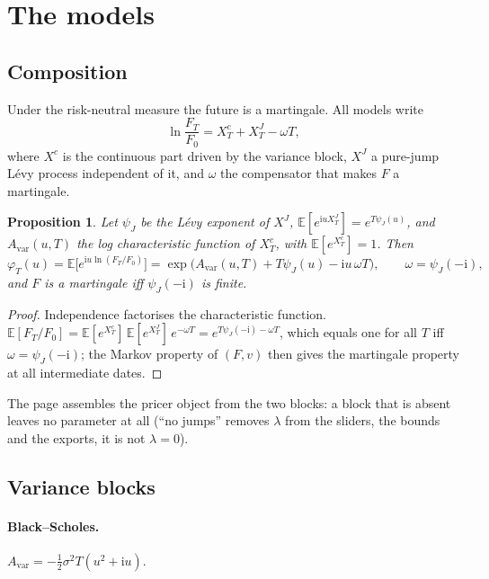 \documentclass[11pt,a4paper]{article}
\newtheorem{proposition}{Proposition}
\theoremstyle{definition}
\theoremstyle{remark}
\newcommand{\E}{\mathbb{E}}
\newcommand{\ii}{\mathrm{i}}
\begin{document}
\section{The models}\label{sec:models}
\subsection{Composition}
Under the risk-neutral measure the future is a martingale. All models write
\begin{equation}\label{eq:compo}
  \ln\frac{F_T}{F_0}=X^{c}_T+X^{J}_T-\omega T,
\end{equation}
where $X^c$ is the continuous part driven by the variance block, $X^J$ a pure-jump Lévy process independent of it, and $\omega$
the compensator that makes $F$ a martingale.
\begin{proposition}\label{prop:compo}
Let $\psi_J$ be the Lévy exponent of $X^J$, $\E[e^{\ii uX^J_T}]=e^{T\psi_J(u)}$, and $A_{\mathrm{var}}(u,T)$ the log characteristic
function of $X^c_T$, with $\E[e^{X^c_T}]=1$. Then
\begin{equation}
  \varphi_T(u)=\E\big[e^{\ii u\ln(F_T/F_0)}\big]=\exp\Big(A_{\mathrm{var}}(u,T)+T\psi_J(u)-\ii u\,\omega T\Big),\qquad \omega=\psi_J(-\ii),
\end{equation}
and $F$ is a martingale iff $\psi_J(-\ii)$ is finite.
\end{proposition}
\begin{proof}
Independence factorises the characteristic function. $\E[F_T/F_0]=\E[e^{X^c_T}]\,\E[e^{X^J_T}]\,e^{-\omega T}
=e^{T\psi_J(-\ii)-\omega T}$, which equals one for all $T$ iff $\omega=\psi_J(-\ii)$; the Markov property of $(F,v)$ then gives
the martingale property at all intermediate dates.
\end{proof}
The page assembles the pricer object from the two blocks: a block that is absent leaves no parameter at all (``no jumps''
removes $\lambda$ from the sliders, the bounds and the exports, it is not $\lambda=0$).

\subsection{Variance blocks}
\paragraph{Black--Scholes.} $A_{\mathrm{var}}=-\tfrac12\sigma^2T(u^2+\ii u)$.
\end{document}
